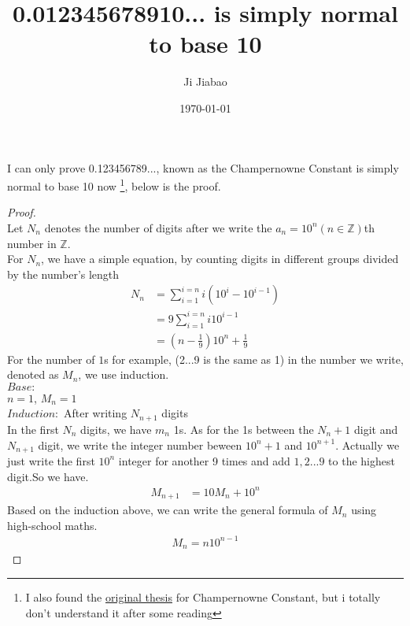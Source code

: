 \documentclass{article}
\title{0.012345678910... is simply normal to base 10}
\author{Ji Jiabao}
\date{\today}
\begin{document}
\maketitle
I can only prove 0.123456789..., known as the Champernowne Constant is simply
normal to base 10 now
\footnote{I also found the 
\href{https://londmathsoc.onlinelibrary.wiley.com/doi/abs/10.1112/jlms/s1-8.4.254}{original thesis} for Champernowne Constant, 
but i totally don't understand it after some reading}, below is the proof.

\begin{proof}
    $  $ \\
    \hspace*{1em} Let $N_n$ denotes the number of digits after we write the $a_n = 10^n (n \in \mathbb{Z})$th number 
    in $\mathbb{Z}$.\\
    \hspace*{1em} For $N_n$, we have a simple equation, by counting digits in different groups 
    divided by the number's length
    \begin{align*}
        N_n &= \sum_{i = 1}^{i = n} i (10^i - 10^{i - 1}) \\
            &= 9 \sum_{i = 1}^{i = n} i 10^{i - 1}\\
            &= (n - \frac{1}{9})10^n + \frac{1}{9}
    \end{align*}
    \hspace*{1em} For the number of $1$s for example, (2...9 is the same as 1) in the number we write, denoted as 
    $M_n$, we use induction.\\
    \hspace*{1em} $Base:$ \\
    \hspace*{2em} $n = 1$, $M_n = 1$\\
    \hspace*{1em} $Induction:$ After writing $N_{n+1}$ digits\\
    \hspace*{2em} In the first $N_n$ digits, we have $m_n$ 1s. As for the 1s between the $N_n + 1$ digit and $N_{n+1}$ digit,
    we write the integer number beween $10^n + 1$ and $10^{n + 1}$. Actually we just write the first $10^n$ integer for another 9 times
    and add $1, 2 ... 9$ to the highest digit.So we have.
    \begin{align*}
        M_{n + 1} & = 10M_n + 10^n
    \end{align*}
    \hspace*{1em} Based on the induction above, we can write the general formula of $M_n$ using high-school maths.
    \begin{align*}
        M_n = n10^{n - 1}
    \end{align*}
    

\end{proof}
\end{document}
